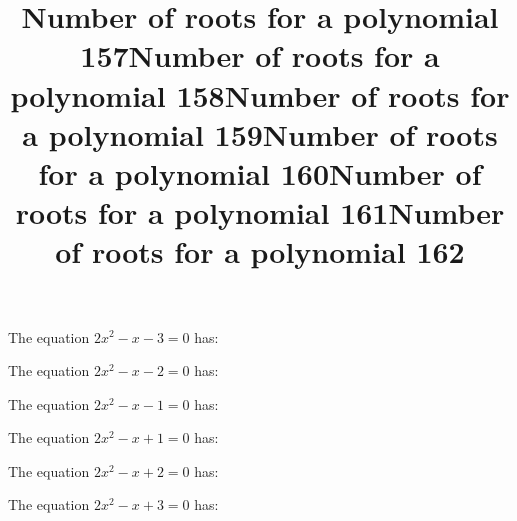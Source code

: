 \documentclass{article}
\begin{document}
\begin{category}
\begin{question}[multichoice]

\end{question}
\begin{question}[multichoice]
\title{Number of roots for a polynomial 157}
The equation $2 x^{2} - x - 3=0$ has:


\end{question}
\begin{question}[multichoice]
\title{Number of roots for a polynomial 158}
The equation $2 x^{2} - x - 2=0$ has:


\end{question}
\begin{question}[multichoice]
\title{Number of roots for a polynomial 159}
The equation $2 x^{2} - x - 1=0$ has:


\end{question}
\begin{question}[multichoice]
\title{Number of roots for a polynomial 160}
The equation $2 x^{2} - x + 1=0$ has:


\end{question}
\begin{question}[multichoice]
\title{Number of roots for a polynomial 161}
The equation $2 x^{2} - x + 2=0$ has:


\end{question}
\begin{question}[multichoice]
\title{Number of roots for a polynomial 162}
The equation $2 x^{2} - x + 3=0$ has:



\end{question}
\end{category}
\end{document}

